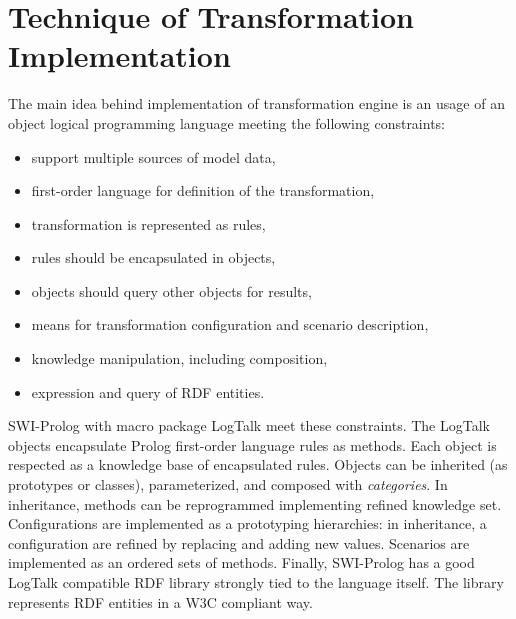 \documentclass[conference]{IEEEtran}
\begin{document}
\section{Technique of Transformation Implementation}
\label{sec:tech-imp}

The main idea behind implementation of transformation engine is an usage of an object logical programming language meeting the following constraints:
\begin{itemize}
\item support multiple sources of model data,
\item first-order language for definition of the transformation,
\item transformation is represented as rules,
\item rules should be encapsulated in objects,
\item objects should query other objects for results,
\item means for transformation configuration and scenario description,
\item knowledge manipulation, including composition,
\item expression and query of RDF entities.
\end{itemize}


SWI-Prolog with macro package LogTalk meet these constraints.  The LogTalk objects encapsulate Prolog first-order language rules as methods.  Each object is respected as a knowledge base of encapsulated rules.  Objects can be inherited (as prototypes or classes), parameterized, and composed with \emph{categories}.  In inheritance, methods can be reprogrammed implementing refined knowledge set.  Configurations are implemented as a prototyping hierarchies: in inheritance, a configuration are refined by replacing and adding new values.  Scenarios are implemented as an ordered sets of methods.  Finally, SWI-Prolog has a good LogTalk compatible RDF library strongly tied to the language itself.  The library represents RDF entities in a W3C compliant way.


\end{document}

